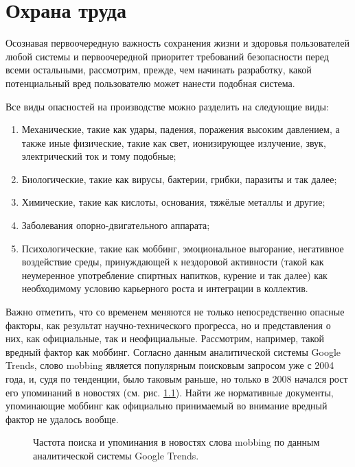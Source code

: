 \chapter{Охрана труда}
Осознавая первоочередную важность сохранения жизни и здоровья пользователей любой системы и первоочередной приоритет требований безопасности перед всеми остальными, рассмотрим, прежде, чем начинать разработку, какой потенциальный вред пользователю может нанести подобная система.

Все виды опасностей на производстве можно разделить на следующие виды\cite{enwikiosh}:
\begin{enumerate}
	\item
		Механические, такие как удары, падения, поражения высоким давлением, а также иные физические, такие как свет, ионизирующее излучение, звук, электрический ток и тому подобные;
	\item
		Биологические, такие как вирусы, бактерии, грибки, паразиты и так далее;
	\item
		Химические, такие как кислоты, основания, тяжёлые металлы и другие;
	\item
		Заболевания опорно-двигательного аппарата;
	\item
		Психологические, такие как моббинг\cite{enwikimobbing}, эмоциональное выгорание\cite{enwikiburnout}, негативное воздействие среды, принуждающей к нездоровой активности (такой как неумеренное употребление спиртных напитков, курение и так далее) как необходимому условию карьерного роста и интеграции в коллектив.
\end{enumerate}

Важно отметить, что со временем меняются не только непосредственно опасные факторы, как результат научно-технического прогресса, но и представления о них, как официальные, так и неофициальные. Рассмотрим, например, такой вредный фактор как моббинг. Согласно данным аналитической системы Google Trends, слово mobbing является популярным поисковым запросом уже с 2004 года, и, судя по тенденции, было таковым раньше,  но только в 2008 начался рост его упоминаний в новостях (см. рис. \ref{fig:google-trends-mobbing}). Найти же нормативные документы, упоминающие моббинг как официально принимаемый во внимание вредный фактор не удалось вообще.

\begin{figure}[h]
	\caption{Частота поиска и упоминания в новостях слова mobbing по данным аналитической системы Google Trends.}
	\label{fig:google-trends-mobbing}
\end{figure}

